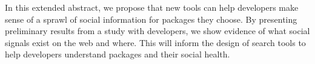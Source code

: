In this extended abstract, we propose that new tools can help developers make sense of a sprawl of social information for packages they choose.
By presenting preliminary results from a study with developers, we show evidence of what social signals exist on the web and where.
This will inform the design of search tools to help developers understand packages and their social health.
